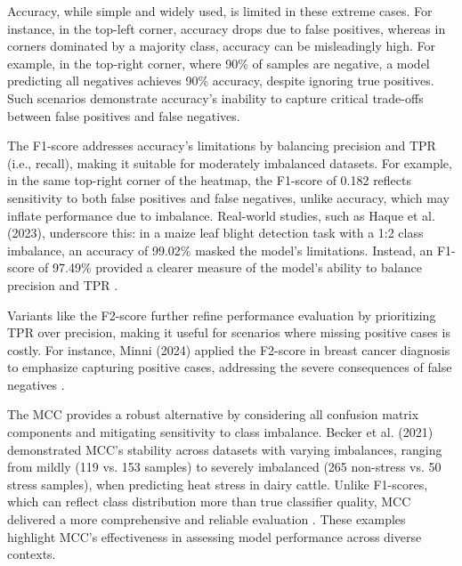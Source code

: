 Accuracy, while simple and widely used, is limited in these extreme cases. For instance, in the top-left corner, accuracy drops due to false positives, whereas in corners dominated by a majority class, accuracy can be misleadingly high. For example, in the top-right corner, where 90\% of samples are negative, a model predicting all negatives achieves 90\% accuracy, despite ignoring true positives. Such scenarios demonstrate accuracy’s inability to capture critical trade-offs between false positives and false negatives.

The F1-score addresses accuracy’s limitations by balancing precision and TPR (i.e., recall), making it suitable for moderately imbalanced datasets. For example, in the same top-right corner of the heatmap, the F1-score of 0.182 reflects sensitivity to both false positives and false negatives, unlike accuracy, which may inflate performance due to imbalance. Real-world studies, such as Haque et al. (2023), underscore this: in a maize leaf blight detection task with a 1:2 class imbalance, an accuracy of 99.02\% masked the model’s limitations. Instead, an F1-score of 97.49\% provided a clearer measure of the model’s ability to balance precision and TPR \citep{haque_recognition_2023}.

Variants like the F2-score further refine performance evaluation by prioritizing TPR over precision, making it useful for scenarios where missing positive cases is costly. For instance, Minni (2024) applied the F2-score in breast cancer diagnosis to emphasize capturing positive cases, addressing the severe consequences of false negatives \citep{minni_exploring_2024}.

The MCC provides a robust alternative by considering all confusion matrix components and mitigating sensitivity to class imbalance. Becker et al. (2021) demonstrated MCC’s stability across datasets with varying imbalances, ranging from mildly (119 vs. 153 samples) to severely imbalanced (265 non-stress vs. 50 stress samples), when predicting heat stress in dairy cattle. Unlike F1-scores, which can reflect class distribution more than true classifier quality, MCC delivered a more comprehensive and reliable evaluation \citep{becker_predicting_2021}. These examples highlight MCC’s effectiveness in assessing model performance across diverse contexts.